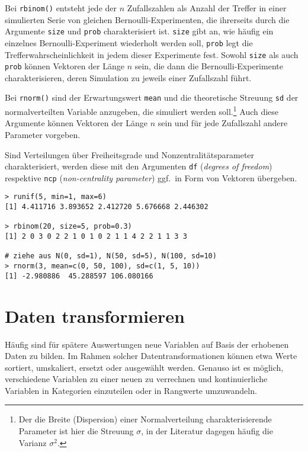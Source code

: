 Bei \lstinline!rbinom()! entsteht jede der $n$ Zufallszahlen als Anzahl der Treffer in einer simulierten Serie von gleichen Bernoulli-Experimenten, die ihrerseits durch die Argumente \lstinline!size! und \lstinline!prob! charakterisiert ist. \lstinline!size! gibt an, wie häufig ein einzelnes Bernoulli-Experiment wiederholt werden soll, \lstinline!prob! legt die Trefferwahrscheinlichkeit in jedem dieser Experimente fest. Sowohl \lstinline!size! als auch \lstinline!prob! können Vektoren der Länge $n$ sein, die dann die Bernoulli-Experimente charakterisieren, deren Simulation zu jeweils einer Zufallszahl führt.

Bei \lstinline!rnorm()! sind der Erwartungswert \lstinline!mean! und die theoretische Streuung \lstinline!sd! der normalverteilten Variable anzugeben, die simuliert werden soll.\footnote{Der die Breite (Dispersion) einer Normalverteilung charakterisierende Parameter ist hier die Streuung $\sigma$, in der Literatur dagegen häufig die Varianz $\sigma^{2}$.} Auch diese Argumente können Vektoren der Länge $n$ sein und für jede Zufallszahl andere Parameter vorgeben.

Sind Verteilungen über Freiheitsgrade und Nonzentralitätsparameter charakterisiert, werden diese mit den Argumenten \lstinline!df! (\emph{degrees of freedom}) respektive \lstinline!ncp! (\emph{non-centrality parameter}) ggf.\ in Form von Vektoren übergeben.
\begin{lstlisting}
> runif(5, min=1, max=6)
[1] 4.411716 3.893652 2.412720 5.676668 2.446302

> rbinom(20, size=5, prob=0.3)
[1] 2 0 3 0 2 2 1 0 1 0 2 1 1 4 2 2 1 1 3 3

# ziehe aus N(0, sd=1), N(50, sd=5), N(100, sd=10)
> rnorm(3, mean=c(0, 50, 100), sd=c(1, 5, 10))
[1] -2.980886  45.288597 106.080166
\end{lstlisting}

\section{Daten transformieren}
\label{sec:varTransform}

Häufig sind für spätere Auswertungen neue Variablen auf Basis der erhobenen Daten zu bilden. Im Rahmen solcher Datentransformationen können etwa Werte sortiert, umskaliert, ersetzt oder ausgewählt werden. Genauso ist es möglich, verschiedene Variablen zu einer neuen zu verrechnen und kontinuierliche Variablen in Kategorien einzuteilen oder in Rangwerte umzuwandeln.

